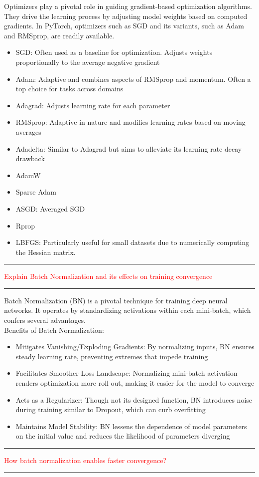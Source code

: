 \documentclass{article}
\begin{document}
Optimizers play a pivotal role in guiding gradient-based optimization algorithms. They drive the learning process by adjusting model weights based on computed gradients. In PyTorch, optimizers such as SGD and its variants, such as Adam and RMSprop, are readily available.
\begin{itemize}
    \item SGD: Often used as a baseline for optimization. Adjusts weights proportionally to the average negative gradient
    \item Adam: Adaptive and combines aspects of RMSprop and momentum. Often a top choice for tasks across domains
    \item Adagrad: Adjusts learning rate for each parameter
    \item RMSprop: Adaptive in nature and modifies learning rates based on moving averages
    \item Adadelta: Similar to Adagrad but aims to alleviate its learning rate decay drawback
    \item AdamW
    \item Sparse Adam
    \item ASGD: Averaged SGD
    \item Rprop
    \item LBFGS: Particularly useful for small datasets due to numerically computing the Hessian matrix.
\end{itemize}

\noindent
{\color{red} \rule{\linewidth}{0.5mm}}
\textcolor{red}{Explain Batch Normalization and its effects on training convergence} \\
\noindent
{\color{red} \rule{\linewidth}{0.5mm}}
Batch Normalization (BN) is a pivotal technique for training deep neural networks. It operates by standardizing activations within each mini-batch, which confers several advantages.\\
Benefits of Batch Normalization:
\begin{itemize}
    \item Mitigates Vanishing/Exploding Gradients: By normalizing inputs, BN ensures steady learning rate, preventing extremes that impede training
    \item Facilitates Smoother Loss Landscape: Normalizing mini-batch activation renders optimization more roll out, making it easier for the model to converge 
    \item Acts as a Regularizer: Though not its designed function, BN introduces noise during training similar to Dropout, which can curb overfitting
    \item Maintains Model Stability: BN lessens the dependence of model parameters on the initial value and reduces the likelihood of parameters diverging
\end{itemize}
\noindent
{\color{red} \rule{\linewidth}{0.5mm}}
\textcolor{red}{How batch normalization enables faster convergence?} \\
\noindent
{\color{red} \rule{\linewidth}{0.5mm}}
\end{document}
